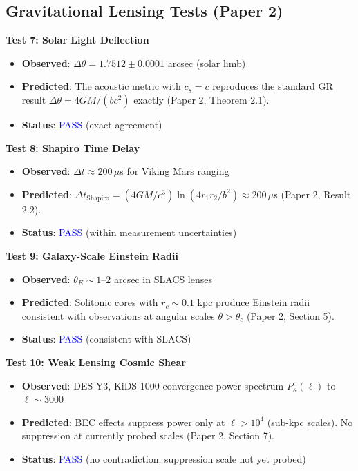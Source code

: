 \documentclass[11pt,a4paper]{article}
\theoremstyle{definition}
\theoremstyle{remark}
\begin{document}
\subsection{Gravitational Lensing Tests (Paper 2)}
\label{sec:tests_lensing}

\textbf{Test 7: Solar Light Deflection}

\begin{itemize}[leftmargin=*, itemsep=0.1em]
\item \textbf{Observed}: $\Delta\theta = 1.7512 \pm 0.0001$ arcsec (solar limb)
\item \textbf{Predicted}: The acoustic metric with $c_s = c$ reproduces the standard GR result $\Delta\theta = 4GM/(bc^2)$ exactly (Paper 2, Theorem 2.1).
\item \textbf{Status}: \textcolor{blue}{PASS} (exact agreement)
\end{itemize}

\textbf{Test 8: Shapiro Time Delay}

\begin{itemize}[leftmargin=*, itemsep=0.1em]
\item \textbf{Observed}: $\Delta t \approx 200 \, \mu$s for Viking Mars ranging
\item \textbf{Predicted}: $\Delta t_{\mathrm{Shapiro}} = (4GM/c^3)\ln(4r_1 r_2/b^2) \approx 200 \, \mu$s (Paper 2, Result 2.2).
\item \textbf{Status}: \textcolor{blue}{PASS} (within measurement uncertainties)
\end{itemize}

\textbf{Test 9: Galaxy-Scale Einstein Radii}

\begin{itemize}[leftmargin=*, itemsep=0.1em]
\item \textbf{Observed}: $\theta_E \sim 1$--$2$ arcsec in SLACS lenses
\item \textbf{Predicted}: Solitonic cores with $r_c \sim 0.1$ kpc produce Einstein radii consistent with observations at angular scales $\theta > \theta_c$ (Paper 2, Section 5).
\item \textbf{Status}: \textcolor{blue}{PASS} (consistent with SLACS)
\end{itemize}

\textbf{Test 10: Weak Lensing Cosmic Shear}

\begin{itemize}[leftmargin=*, itemsep=0.1em]
\item \textbf{Observed}: DES Y3, KiDS-1000 convergence power spectrum $P_\kappa(\ell)$ to $\ell \sim 3000$
\item \textbf{Predicted}: BEC effects suppress power only at $\ell > 10^4$ (sub-kpc scales). No suppression at currently probed scales (Paper 2, Section 7).
\item \textbf{Status}: \textcolor{blue}{PASS} (no contradiction; suppression scale not yet probed)
\end{itemize}
\end{document}
